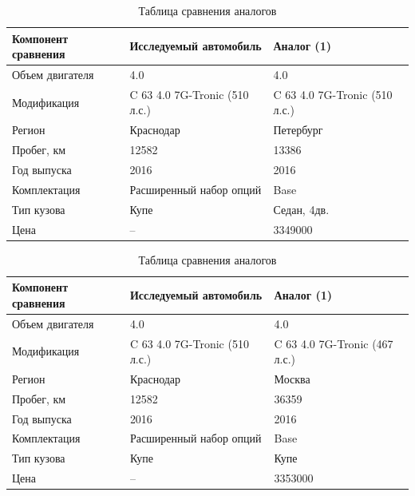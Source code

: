   \begin{longtable}{|p{5cm}|p{5cm}|p{5cm}|}
	\caption[]{\footnotesize {Таблица сравнения аналогов}} \label{tab:9}\\ 
	\hline
	\rowcolor[HTML]{EFEFEF} 
	
	Компонент сравнения & Исследуемый автомобиль& Аналог (1)  \\ \hline \endhead %
	Объем двигателя  &4.0 & 4.0 \\ \hline
	Модификация  &C 63 4.0 7G-Tronic (510 л.с.)  & C 63 4.0 7G-Tronic (510 л.с.)\\ \hline
	\rowcolor[HTML]{ FAEBD7}
	Регион  & Краснодар  & Петербург\\ \hline
	Пробег, км & 12582  & 13386\\ \hline
	Год выпуска  & 2016  & 2016 \\ \hline
		\rowcolor[HTML]{ FAEBD7}
	Комплектация  & Расширенный набор опций  & Base \\ \hline
	\rowcolor[HTML]{ FAEBD7}
	Тип кузова  & Купе  & Седан, 4дв. \\ \hline
	Цена  & --  & 3349000 \\ \hline
\end{longtable}

  \begin{longtable}{|p{5cm}|p{5cm}|p{5cm}|}
	\caption[]{\footnotesize {Таблица сравнения аналогов}} \label{tab:10}\\ 
	\hline
	\rowcolor[HTML]{EFEFEF} 
	
	Компонент сравнения & Исследуемый автомобиль& Аналог (1)  \\ \hline \endhead %
	Объем двигателя  &4.0 & 4.0 \\ \hline
    \rowcolor[HTML]{ FAEBD7} 
	Модификация  &C 63 4.0 7G-Tronic (510 л.с.)  & C 63 4.0 7G-Tronic (467 л.с.)\\ \hline
		\rowcolor[HTML]{ FAEBD7}
	Регион  & Краснодар  & Москва\\ \hline
	\rowcolor[HTML]{ FAEBD7}
	Пробег, км & 12582  & 36359\\ \hline
	Год выпуска  & 2016  & 2016 \\ \hline
	\rowcolor[HTML]{ FAEBD7}
	Комплектация  & Расширенный набор опций  & Base \\ \hline
	Тип кузова  & Купе  & Купе \\ \hline
	Цена  &  -- & 3353000 \\ \hline
\end{longtable}

